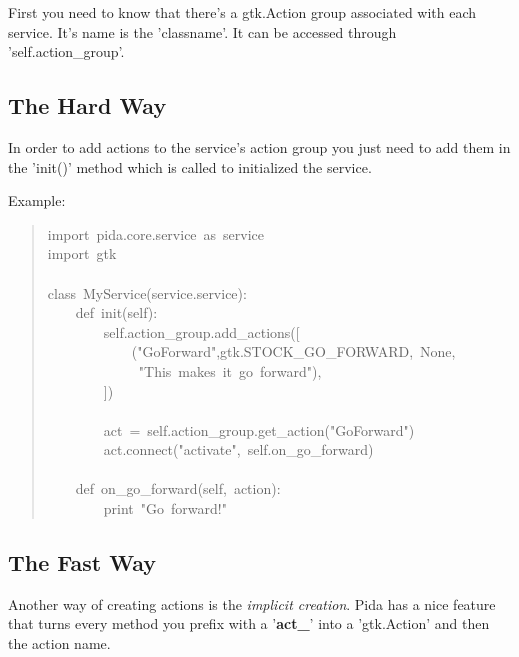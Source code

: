 \documentclass[10pt,a4paper,english]{article}
\begin{document}
First you need to know that there's a gtk.Action group associated with
each service. It's name is the 'classname'.
It can be accessed through 'self.action{\_}group'.



\hypertarget{the-hard-way}{}
\subsection*{The Hard Way}

In order to add actions to the service's action group you just need
to add them in the 'init()' method which is called to initialized the
service.

Example:
\begin{quote}{\ttfamily \raggedright \noindent
import~pida.core.service~as~service~\\
import~gtk~\\
~\\
class~MyService(service.service):~\\
~~~~def~init(self):~\\
~~~~~~~~self.action{\_}group.add{\_}actions({[}~\\
~~~~~~~~~~~~("GoForward",gtk.STOCK{\_}GO{\_}FORWARD,~None,~\\
~~~~~~~~~~~~~"This~makes~it~go~forward"),~\\
~~~~~~~~])~\\
~~~~~~~~~\\
~~~~~~~~act~=~self.action{\_}group.get{\_}action("GoForward")~\\
~~~~~~~~act.connect("activate",~self.on{\_}go{\_}forward)~\\
~~~~~\\
~~~~def~on{\_}go{\_}forward(self,~action):~\\
~~~~~~~~print~"Go~forward!"
}\end{quote}



\hypertarget{the-fast-way}{}
\subsection*{The Fast Way}

Another way of creating actions is the \emph{implicit creation}. Pida has a nice
feature that turns every method you prefix with a '{\color{red}\bfseries{}act{\_}}' into a 'gtk.Action' and
then the action name.
\end{document}
